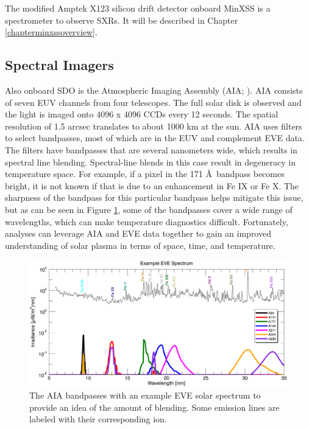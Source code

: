 The modified Amptek X123 silicon drift detector onboard MinXSS is a spectrometer to observe SXRs. It will be described in Chapter \ref{chapterminxssoverview}. 

\subsection{Spectral Imagers}
Also onboard SDO is the Atmospheric Imaging Assembly (AIA; \citealt{Lemen2012}). AIA consists of seven EUV channels from four telescopes. The full solar disk is observed and the light is imaged onto 4096 x 4096 CCDs every 12 seconds. The spatial resolution of 1.5 arcsec translates to about 1000 km at the sun. AIA uses filters to select bandpasses, most of which are in the EUV and complement EVE data. The filters have bandpasses that are several nanometers wide, which results in spectral line blending. Spectral-line blends in this case result in degeneracy in temperature space. For example, if a pixel in the 171 \AA\ bandpass becomes bright, it is not known if that is due to an enhancement in Fe IX or Fe X. The sharpness of the bandpass for this particular bandpass helps mitigate this issue, but as can be seen in Figure \ref{fig:aiabandpasses}, some of the bandpasses cover a wide range of wavelengths, which can make temperature diagnostics difficult. Fortunately, analyses can leverage AIA and EVE data together to gain an improved understanding of solar plasma in terms of space, time, and temperature. 

\begin{figure}[!h]
    \begin{center}
	    \includegraphics[width=\textwidth]{Images/AiaBandpasses.png}
    \end{center}
    \caption[AIA bandpasses]{
	    The AIA bandpasses with an example EVE solar spectrum to provide an idea of the amount of blending. 
	    Some emission lines are labeled with their corresponding ion. 
	}
    \label{fig:aiabandpasses}
\end{figure}

